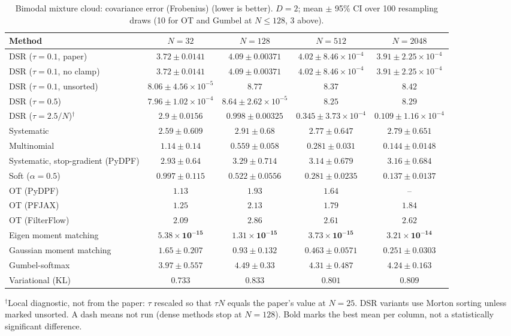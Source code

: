 \begin{table}[H]
\centering
\small
\caption{Bimodal mixture cloud: covariance error (Frobenius) (lower is better). $D{=}2$; mean $\pm$ 95\% CI over 100 resampling draws (10 for OT and Gumbel at $N\le128$, 3 above).}
\label{tab:static-mixture-covariance_error}
\begin{adjustbox}{max width=\linewidth}
\begin{tabular}{lcccc}
\toprule
Method & $N{=}32$ & $N{=}128$ & $N{=}512$ & $N{=}2048$ \\
\midrule
DSR ($\tau{=}0.1$, paper) & $3.72\pm0.0141$ & $4.09\pm0.00371$ & $4.02\pm8.46\times10^{-4}$ & $3.91\pm2.25\times10^{-4}$ \\
DSR ($\tau{=}0.1$, no clamp) & $3.72\pm0.0141$ & $4.09\pm0.00371$ & $4.02\pm8.46\times10^{-4}$ & $3.91\pm2.25\times10^{-4}$ \\
DSR ($\tau{=}0.1$, unsorted) & $8.06\pm4.56\times10^{-5}$ & $8.77$ & $8.37$ & $8.42$ \\
DSR ($\tau{=}0.5$) & $7.96\pm1.02\times10^{-4}$ & $8.64\pm2.62\times10^{-5}$ & $8.25$ & $8.29$ \\
DSR ($\tau{=}2.5/N$)$^\dagger$ & $2.9\pm0.0156$ & $0.998\pm0.00325$ & $0.345\pm3.73\times10^{-4}$ & $0.109\pm1.16\times10^{-4}$ \\
\midrule
Systematic & $2.59\pm0.609$ & $2.91\pm0.68$ & $2.77\pm0.647$ & $2.79\pm0.651$ \\
Multinomial & $1.14\pm0.14$ & $0.559\pm0.058$ & $0.281\pm0.031$ & $0.144\pm0.0148$ \\
Systematic, stop-gradient (PyDPF) & $2.93\pm0.64$ & $3.29\pm0.714$ & $3.14\pm0.679$ & $3.16\pm0.684$ \\
Soft ($\alpha{=}0.5$) & $0.997\pm0.115$ & $0.522\pm0.0556$ & $0.281\pm0.0235$ & $0.137\pm0.0137$ \\
OT (PyDPF) & $1.13$ & $1.93$ & $1.64$ & -- \\
OT (PFJAX) & $1.25$ & $2.13$ & $1.79$ & $1.84$ \\
OT (FilterFlow) & $2.09$ & $2.86$ & $2.61$ & $2.62$ \\
Eigen moment matching & $\mathbf{5.38\times10^{-15}}$ & $\mathbf{1.31\times10^{-15}}$ & $\mathbf{3.73\times10^{-15}}$ & $\mathbf{3.21\times10^{-14}}$ \\
Gaussian moment matching & $1.65\pm0.207$ & $0.93\pm0.132$ & $0.463\pm0.0571$ & $0.251\pm0.0303$ \\
Gumbel-softmax & $3.97\pm0.557$ & $4.49\pm0.33$ & $4.31\pm0.487$ & $4.24\pm0.163$ \\
Variational (KL) & $0.733$ & $0.833$ & $0.801$ & $0.809$ \\
\bottomrule
\end{tabular}
\end{adjustbox}
\par\smallskip\parbox{0.95\linewidth}{\footnotesize $^\dagger$Local diagnostic, not from the paper: $\tau$ rescaled so that $\tau N$ equals the paper's value at $N{=}25$. DSR variants use Morton sorting unless marked unsorted. A dash means not run (dense methods stop at $N{=}128$). Bold marks the best mean per column, not a statistically significant difference.}
\end{table}

